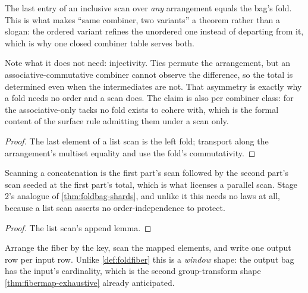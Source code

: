 \begin{theorem}
  \label{thm:scan-fold-coherence}\leanok
  The last entry of an inclusive scan over \emph{any} arrangement equals
  the bag's fold.  This is what makes ``same combiner, two variants'' a
  theorem rather than a slogan: the ordered variant refines the unordered
  one instead of departing from it, which is why one closed combiner table
  serves both.

  Note what it does not need: injectivity.  Ties permute the arrangement,
  but an associative-commutative combiner cannot observe the difference, so
  the total is determined even when the intermediates are not.  That
  asymmetry is exactly why a fold needs no order and a scan does.  The
  claim is also per combiner class: for the associative-only tacks no fold
  exists to cohere with, which is the formal content of the surface rule
  admitting them under a scan only.
\end{theorem}
\begin{proof}\leanok
  The last element of a list scan is the left fold; transport along the
  arrangement's multiset equality and use the fold's commutativity.
\end{proof}

\begin{theorem}
  \label{thm:scan-prefix-decomp}\leanok
  Scanning a concatenation is the first part's scan followed by the second
  part's scan seeded at the first part's total, which is what licenses a
  parallel scan.  Stage 2's analogue of \ref{thm:foldbag-shards}, and
  unlike it this needs no laws at all, because a list scan asserts no
  order-independence to protect.
\end{theorem}
\begin{proof}\leanok
  The list scan's append lemma.
\end{proof}

\begin{definition}
  \label{def:scanfiber}\leanok
  Arrange the fiber by the key, scan the mapped elements, and write one
  output row per input row.  Unlike \ref{def:foldfiber} this is a
  \emph{window} shape: the output bag has the input's cardinality, which is
  the second group-transform shape \ref{thm:fibermap-exhaustive} already
  anticipated.
\end{definition}

